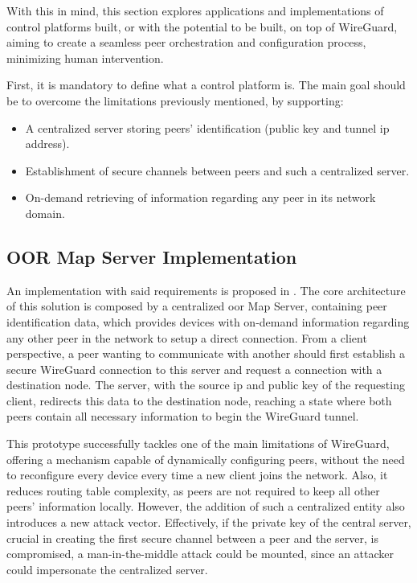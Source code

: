 \documentclass[11pt,twoside,a4paper]{report}
\begin{document}
With this in mind, this section explores applications and implementations of control platforms built, or with the potential to be built, on top of WireGuard, aiming to create a seamless peer orchestration and configuration process, minimizing human intervention.

First, it is mandatory to define what a control platform is. The main goal should be to overcome the limitations previously mentioned, by supporting:

\begin{itemize}
     \item A centralized server storing peers' identification (public key and tunnel \ac{ip} address).
     \item Establishment of secure channels between peers and such a centralized server.
     \item On-demand retrieving of information regarding any peer in its network domain.
\end{itemize}

\subsection{OOR Map Server Implementation}

An implementation with said requirements is proposed in \cite{paillisse2021control}. The core architecture of this solution is composed by a centralized \ac{oor} Map Server, containing peer identification data, which provides devices with on-demand information regarding any other peer in the network to setup a direct connection.  From a client perspective, a peer wanting to communicate with another should first establish a secure WireGuard connection to this server and request a connection with a destination node. The server, with the source \ac{ip} and public key of the requesting client, redirects this data to the destination node, reaching a state where both peers contain all necessary information to begin the WireGuard tunnel.

This prototype successfully tackles one of the main limitations of WireGuard, offering a mechanism capable of dynamically configuring peers, without the need to reconfigure every device every time a new client joins the network. Also, it reduces routing table complexity, as peers are not required to keep all other peers' information locally. However, the addition of such a centralized entity also introduces a new attack vector. Effectively, if the private key of the central server, crucial in creating the first secure channel between a peer and the server, is compromised, a man-in-the-middle attack could be mounted, since an attacker could impersonate the centralized server.
\end{document}
